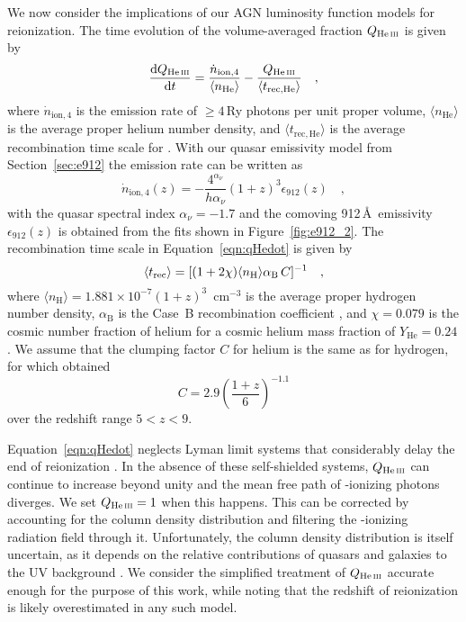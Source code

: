 \documentclass[fleqn,usenatbib]{mnras}
\begin{document}
We now consider the implications of our AGN luminosity function models
for  reionization. The time evolution of the
volume-averaged  fraction $Q_\ion{He}{iii}$ is given by
\citep[e.g.][]{2012ApJ...746..125H}
\begin{equation}
  \frac{\mathrm{d}Q_\ion{He}{iii}}{\mathrm{d}t}=\frac{\dot{n}_\mathrm{ion,4}}{\langle n_\mathrm{He}\rangle}-\frac{Q_\ion{He}{iii}}{\langle t_\mathrm{rec,He}\rangle}\quad,
  \label{eqn:qHedot}
\end{equation}
where $\dot n_\mathrm{ion,4}$ is the emission rate of $\ge 4$\,Ry
photons per unit proper volume, $\langle n_\mathrm{He}\rangle$ is the
average proper helium number density, and $\langle
t_\mathrm{rec,He}\rangle$ is the average recombination time scale for
.  With our quasar emissivity model from
Section~\ref{sec:e912} the emission rate can be written as
\begin{equation}
\dot
n_\mathrm{ion,4}\left(z\right)=-\frac{4^{\alpha_\nu}}{h\alpha_\nu}\left(1+z\right)^3\epsilon_{912}\left(z\right)\quad,
\end{equation}
with the quasar spectral index $\alpha_\nu=-1.7$ and the comoving
912\,\AA\ emissivity $\epsilon_{912}\left(z\right)$ is obtained from
the fits shown in Figure~\ref{fig:e912_2}.  The recombination time
scale in Equation~\eqref{eqn:qHedot} is given by
\begin{equation}
  \langle t_{\rm rec}\rangle=[(1+2\chi) \langle n_\mathrm{H}\rangle \alpha_\mathrm{B}\,C]^{-1}\quad,
  \label{eq:trec}
\end{equation}
where $\langle n_\mathrm{H}\rangle=1.881\times
10^{-7}(1+z)^3$~cm$^{-3}$ is the average proper hydrogen number
density, $\alpha_\mathrm{B}$ is the Case~B  recombination
coefficient \citep{1997MNRAS.292...27H}, and $\chi=0.079$ is the
cosmic number fraction of helium for a cosmic helium mass fraction of
$Y_\mathrm{He}=0.24$.  We assume that the clumping factor $C$ for
helium is the same as for hydrogen, for which
\citet{2012ApJ...747..100S} obtained
\begin{equation}
  C = 2.9\left(\frac{1+z}{6}\right)^{-1.1}
\end{equation}
over the redshift range $5<z<9$. 

Equation~\eqref{eqn:qHedot} neglects  Lyman limit systems
that considerably delay the end of  reionization
\citep{2009MNRAS.395..736B, 2017ApJ...851...50M}.  In the absence of
these self-shielded systems, $Q_\ion{He}{iii}$ can continue to
increase beyond unity and the mean free path of -ionizing
photons diverges.  We set $Q_\ion{He}{iii}=1$ when this happens.  This
can be corrected by accounting for the  column density
distribution and filtering the -ionizing radiation field
through it. Unfortunately, the  column density
distribution is itself uncertain, as it depends on the relative
contributions of quasars and galaxies to the UV background
\citep[e.g.][]{2012ApJ...746..125H,2018arXiv180104931P}.  We consider
the simplified treatment of $Q_\ion{He}{iii}$ accurate enough for the
purpose of this work, while noting that the redshift of 
reionization is likely overestimated in any such model.
\end{document}
